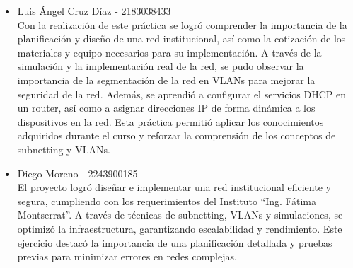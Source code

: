 \begin{itemize}
    \item Luis Ángel Cruz Díaz - 2183038433 \\
    Con la realización de este práctica se logró comprender la importancia de la planificación y diseño de una red institucional, así como la cotización de los materiales y equipo necesarios para su implementación. A través de la simulación y la implementación real de la red, se pudo observar la importancia de la segmentación de la red en VLANs para mejorar la seguridad de la red. Además, se aprendió a configurar el servicios DHCP en un router, así como a asignar direcciones IP de forma dinámica a los dispositivos en la red. Esta práctica permitió aplicar los conocimientos adquiridos durante el curso y reforzar la comprensión de los conceptos de subnetting y VLANs.
    \item Diego Moreno - 2243900185 \\
    El proyecto logró diseñar e implementar una red institucional eficiente y segura, cumpliendo con los requerimientos del Instituto “Ing. Fátima Montserrat”. A través de técnicas de subnetting, VLANs y simulaciones, se optimizó la infraestructura, garantizando escalabilidad y rendimiento. Este ejercicio destacó la importancia de una planificación detallada y pruebas previas para minimizar errores en redes complejas.
\end{itemize}
